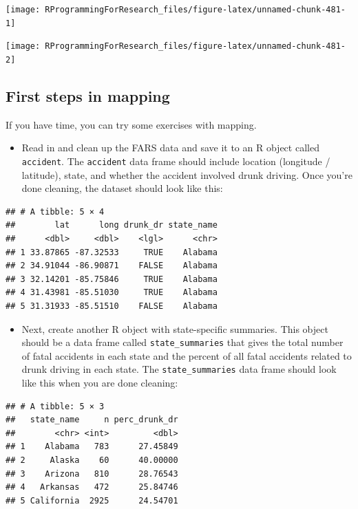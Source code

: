 \documentclass[]{book}
\providecommand{\tightlist}{%
  \setlength{\itemsep}{0pt}\setlength{\parskip}{0pt}}
\begin{document}
\begin{center}\texttt{[image: RProgrammingForResearch\_files/figure-latex/unnamed-chunk-481-1]} \end{center}

\begin{center}\texttt{[image: RProgrammingForResearch\_files/figure-latex/unnamed-chunk-481-2]} \end{center}

\subsection{First steps in mapping}\label{first-steps-in-mapping}

If you have time, you can try some exercises with mapping.

\begin{itemize}
\tightlist
\item
  Read in and clean up the FARS data and save it to an R object called
  \texttt{accident}. The \texttt{accident} data frame should include
  location (longitude / latitude), state, and whether the accident
  involved drunk driving. Once you're done cleaning, the dataset should
  look like this:
\end{itemize}

\begin{verbatim}
## # A tibble: 5 × 4
##        lat      long drunk_dr state_name
##      <dbl>     <dbl>    <lgl>      <chr>
## 1 33.87865 -87.32533     TRUE    Alabama
## 2 34.91044 -86.90871    FALSE    Alabama
## 3 32.14201 -85.75846     TRUE    Alabama
## 4 31.43981 -85.51030     TRUE    Alabama
## 5 31.31933 -85.51510    FALSE    Alabama
\end{verbatim}

\begin{itemize}
\tightlist
\item
  Next, create another R object with state-specific summaries. This
  object should be a data frame called \texttt{state\_summaries} that
  gives the total number of fatal accidents in each state and the
  percent of all fatal accidents related to drunk driving in each state.
  The \texttt{state\_summaries} data frame should look like this when
  you are done cleaning:
\end{itemize}

\begin{verbatim}
## # A tibble: 5 × 3
##   state_name     n perc_drunk_dr
##        <chr> <int>         <dbl>
## 1    Alabama   783      27.45849
## 2     Alaska    60      40.00000
## 3    Arizona   810      28.76543
## 4   Arkansas   472      25.84746
## 5 California  2925      24.54701
\end{verbatim}
\end{document}
